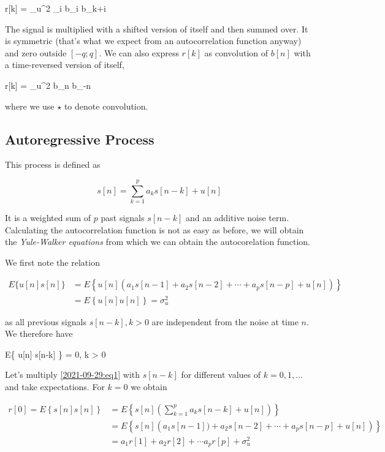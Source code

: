 \bee
r[k] = \sigma_u^2 \sum_i b_i b_{k+i}
\eee

The signal is multiplied with a shifted version of itself and then summed over. It is symmetric (that's what we expect from an autocorrelation function anyway) and zero outside $[-q;q]$. We can also express $r[k]$ as convolution of $b[n]$ with a time-reversed version of itself,

\bee
r[k] = \sigma_u^2 b_n \star b_{-n}
\eee

where we use $\star$ to denote convolution.


\subsection{Autoregressive Process}

This process is defined as


\begin{equation}\label{2021-09-29:eq1}
s[n] = \sum_{k=1}^p a_k s[n-k] + u[n]
\end{equation}

It is a weighted sum of $p$ past signals $s[n-k]$ and an additive noise term. Calculating the autocorrelation function is not as easy as before, we will obtain the \emph{Yule-Walker equations} from which we can obtain the autocorelation function.

We first note the relation

\begin{align*}
E\{ u[n] s[n] \} &= E\left\{ u[n] \left( a_1 s[n-1] + a_2 s[n-2] + \cdots + a_p s[n-p] + u[n] \right) \right\} \\
&= E\left\{ u[n] u[n] \right\} = \sigma_u^2
\end{align*}

as all previous signals $s[n-k], k>0$ are independent from the noise at time $n$. We therefore have

\bee
E\{ u[n] s[n-k] \} = 0, \qquad k > 0
\eee

Let's multiply \eqref{2021-09-29:eq1} with $s[n-k]$ for different values of $k=0,1, \ldots$ and take expectations. For $k=0$ we obtain

\begin{align*}
r[0] = E\left\{ s[n] s[n] \right\} &= E\left\{ s[n] \left( \sum_{k=1}^p a_k s[n-k] + u[n] \right) \right\} \\
&= E\left\{ s[n] \left( a_1 s[n-1]) + a_2 s[n-2] + \cdots + a_p s[n-p] + u[n] \right) \right\} \\
&= a_1 r[1] + a_2 r[2] + \cdots a_p r[p] + \sigma_u^2
\end{align*}

